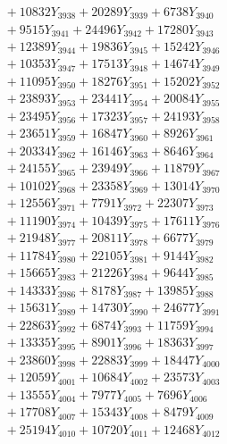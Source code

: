 \documentclass[a4paper,10pt]{article}
\begin{document}
{\begin{align}
&\;  + 10832 Y_{3938} + 20289 Y_{3939} + 6738 Y_{3940} \\[0.3ex]
&\;  + 9515 Y_{3941} + 24496 Y_{3942} + 17280 Y_{3943} \\[0.3ex]
&\;  + 12389 Y_{3944} + 19836 Y_{3945} + 15242 Y_{3946} \\[0.3ex]
&\;  + 10353 Y_{3947} + 17513 Y_{3948} + 14674 Y_{3949} \\[0.3ex]
&\;  + 11095 Y_{3950} + 18276 Y_{3951} + 15202 Y_{3952} \\[0.3ex]
&\;  + 23893 Y_{3953} + 23441 Y_{3954} + 20084 Y_{3955} \\[0.3ex]
&\;  + 23495 Y_{3956} + 17323 Y_{3957} + 24193 Y_{3958} \\[0.5ex]\allowbreak
&\;  + 23651 Y_{3959} + 16847 Y_{3960} + 8926 Y_{3961} \\[0.3ex]
&\;  + 20334 Y_{3962} + 16146 Y_{3963} + 8646 Y_{3964} \\[0.3ex]
&\;  + 24155 Y_{3965} + 23949 Y_{3966} + 11879 Y_{3967} \\[0.3ex]
&\;  + 10102 Y_{3968} + 23358 Y_{3969} + 13014 Y_{3970} \\[0.3ex]
&\;  + 12556 Y_{3971} + 7791 Y_{3972} + 22307 Y_{3973} \\[0.3ex]
&\;  + 11190 Y_{3974} + 10439 Y_{3975} + 17611 Y_{3976} \\[0.3ex]
&\;  + 21948 Y_{3977} + 20811 Y_{3978} + 6677 Y_{3979} \\[0.3ex]
&\;  + 11784 Y_{3980} + 22105 Y_{3981} + 9144 Y_{3982} \\[0.3ex]
&\;  + 15665 Y_{3983} + 21226 Y_{3984} + 9644 Y_{3985} \\[0.3ex]
&\;  + 14333 Y_{3986} + 8178 Y_{3987} + 13985 Y_{3988} \\[0.5ex]\allowbreak
&\;  + 15631 Y_{3989} + 14730 Y_{3990} + 24677 Y_{3991} \\[0.3ex]
&\;  + 22863 Y_{3992} + 6874 Y_{3993} + 11759 Y_{3994} \\[0.3ex]
&\;  + 13335 Y_{3995} + 8901 Y_{3996} + 18363 Y_{3997} \\[0.3ex]
&\;  + 23860 Y_{3998} + 22883 Y_{3999} + 18447 Y_{4000} \\[0.3ex]
&\;  + 12059 Y_{4001} + 10684 Y_{4002} + 23573 Y_{4003} \\[0.3ex]
&\;  + 13555 Y_{4004} + 7977 Y_{4005} + 7696 Y_{4006} \\[0.3ex]
&\;  + 17708 Y_{4007} + 15343 Y_{4008} + 8479 Y_{4009} \\[0.3ex]
&\;  + 25194 Y_{4010} + 10720 Y_{4011} + 12468 Y_{4012} \\[0.3ex]

\end{align}}
\end{document}
